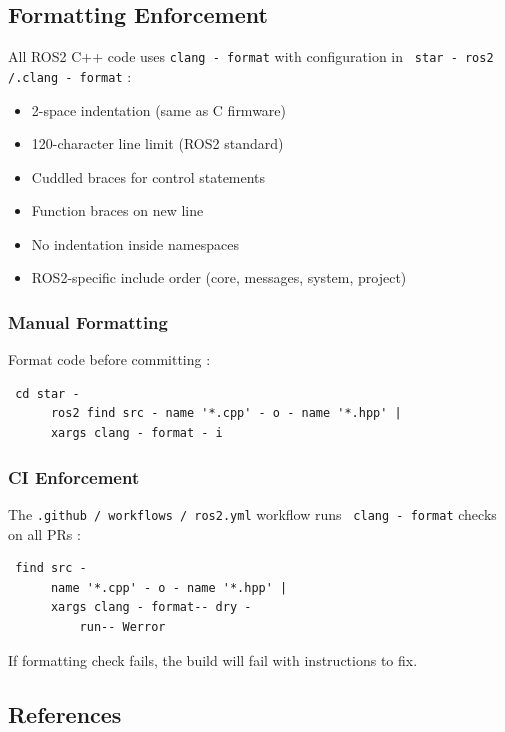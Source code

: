   \subsection{Formatting Enforcement}

  All ROS2 C++ code uses \texttt{clang - format} with configuration in \texttt{
      star - ros2 /.clang - format} :

\begin{itemize}
  \item 2-space indentation (same as C firmware)
  \item 120-character line limit (ROS2 standard)
  \item Cuddled braces for control statements
  \item Function braces on new line
  \item No indentation inside namespaces
  \item ROS2-specific include order (core, messages, system, project)
\end{itemize}

  \subsubsection{Manual Formatting}

          Format code before committing :

\begin{verbatim} cd star -
      ros2 find src - name '*.cpp' - o - name '*.hpp' |
      xargs clang - format - i
\end{verbatim}

  \subsubsection{CI Enforcement}

          The \texttt{.github / workflows / ros2.yml} workflow runs \texttt{
              clang - format} checks on all PRs :

\begin{verbatim} find src -
      name '*.cpp' - o - name '*.hpp' |
      xargs clang - format-- dry -
          run-- Werror
\end{verbatim}

          If formatting check fails,
      the build will fail with instructions to fix.

\subsection{References
 }


